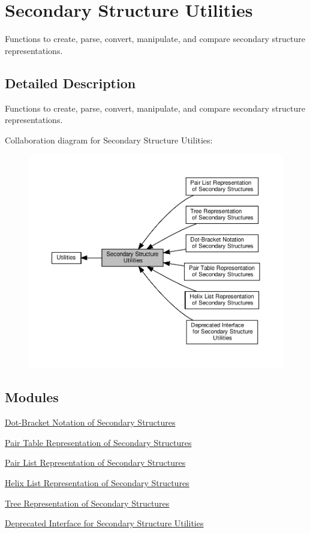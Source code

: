 \hypertarget{group__struct__utils}{}\section{Secondary Structure Utilities}
\label{group__struct__utils}


Functions to create, parse, convert, manipulate, and compare secondary structure representations.  




\subsection{Detailed Description}
Functions to create, parse, convert, manipulate, and compare secondary structure representations. 

Collaboration diagram for Secondary Structure Utilities\+:
\nopagebreak
\begin{figure}[H]
\begin{center}
\leavevmode
\includegraphics[width=350pt]{group__struct__utils}
\end{center}
\end{figure}
\subsection*{Modules}
\begin{DoxyCompactItemize}
\item 
\hyperlink{group__struct__utils__dot__bracket}{Dot-\/\+Bracket Notation of Secondary Structures}
\item 
\hyperlink{group__struct__utils__pair__table}{Pair Table Representation of Secondary Structures}
\item 
\hyperlink{group__struct__utils__plist}{Pair List Representation of Secondary Structures}
\item 
\hyperlink{group__struct__utils__helix__list}{Helix List Representation of Secondary Structures}
\item 
\hyperlink{group__struct__utils__tree}{Tree Representation of Secondary Structures}
\item 
\hyperlink{group__struct__utils__deprecated}{Deprecated Interface for Secondary Structure Utilities}
\end{DoxyCompactItemize}
